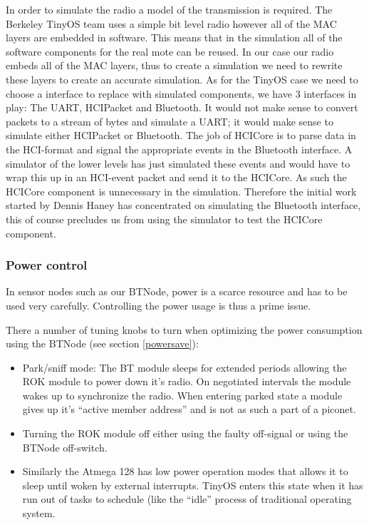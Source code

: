 \documentclass[a4paper,10pt]{article}
\begin{document}
In order to simulate the radio a model of the transmission is
required. The Berkeley TinyOS team uses a simple bit level radio
however all of the MAC layers are embedded in software. This
means that in the simulation all of the software components for the
real mote can be reused. In our case our radio embeds all of the MAC
layers, thus to create a simulation we need to rewrite these layers to
create an accurate simulation. As for the TinyOS case we need to
choose a interface to replace with simulated components, we have 3
interfaces in play: The UART, HCIPacket and Bluetooth. It would
not make sense to convert packets to a stream of bytes and simulate a
UART; it would make sense to simulate either HCIPacket or
Bluetooth. The job of HCICore is to parse data in the HCI-format and
signal the appropriate events in the Bluetooth interface. A simulator
of the lower levels has just simulated these events and would have to
wrap this up in an HCI-event packet and send it to the HCICore. As such the
HCICore component is unnecessary in the simulation. Therefore the
initial work started by Dennis Haney has concentrated on
simulating the Bluetooth interface, this of course precludes us from
using the simulator to test the HCICore component.

\subsubsection{Power control}
In sensor nodes such as our BTNode, power is a scarce resource and has
to be used very carefully. Controlling the power usage is thus a prime
issue.

There a number of tuning knobs to turn when optimizing the power
consumption using the BTNode (see section \ref{powersave}):
\begin{itemize}
\item Park/sniff mode: The BT module sleeps for extended periods
  allowing the ROK module to power down it's radio. On negotiated
  intervals the module wakes up to synchronize the radio. When
  entering parked state a module gives up it's ``active member
  address'' and is not as such a part of a piconet.
  
\item Turning the ROK module off either using the faulty off-signal or
  using the BTNode off-switch.
  
\item Similarly the Atmega 128 has low power operation modes that
  allows it to sleep until woken by external interrupts. TinyOS enters
  this state when it has run out of tasks to schedule (like the
  ``idle'' process of traditional operating system.

\end{itemize}
\end{document}
